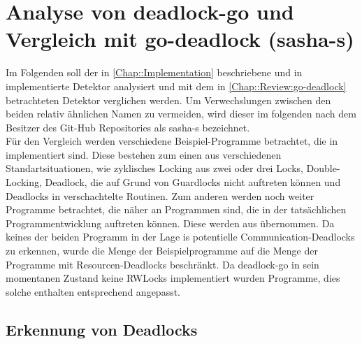 \chapter{Analyse von deadlock-go und Vergleich mit 
    go-deadlock (sasha-s)}
Im Folgenden soll der in \ref{Chap::Implementation} beschriebene und in 
\cite{implementation} implementierte Detektor analysiert und mit dem in 
\ref{Chap::Review:go-deadlock} betrachteten Detektor verglichen
werden. Um Verwechslungen zwischen den beiden relativ ähnlichen Namen zu vermeiden,
wird dieser im folgenden nach dem Besitzer des Git-Hub Repositories als sasha-s
bezeichnet.\\
Für den Vergleich werden verschiedene Beispiel-Programme betrachtet, die in 
\cite{examples} implementiert sind. Diese bestehen zum einen aus verschiedenen 
Standartsituationen, wie zyklisches Locking aus zwei oder drei Locks, 
Double-Locking, Deadlock, die auf 
Grund von Guardlocks nicht auftreten können und Deadlocks in verschachtelte Routinen. 
Zum anderen werden noch weiter 
Programme betrachtet, die näher an Programmen sind, die in der tatsächlichen 
Programmentwicklung auftreten können. Diese werden aus \cite{gobench} übernommen.
Da keines der beiden Programm in der Lage is potentielle Communication-Deadlocks
zu erkennen, wurde die Menge der Beispielprogramme auf die Menge der Programme 
mit Resourcen-Deadlocks beschränkt. Da deadlock-go in sein momentanen Zustand 
keine RWLocks implementiert wurden Programme, dies solche enthalten entsprechend
angepasst.
\section{Erkennung von Deadlocks}

